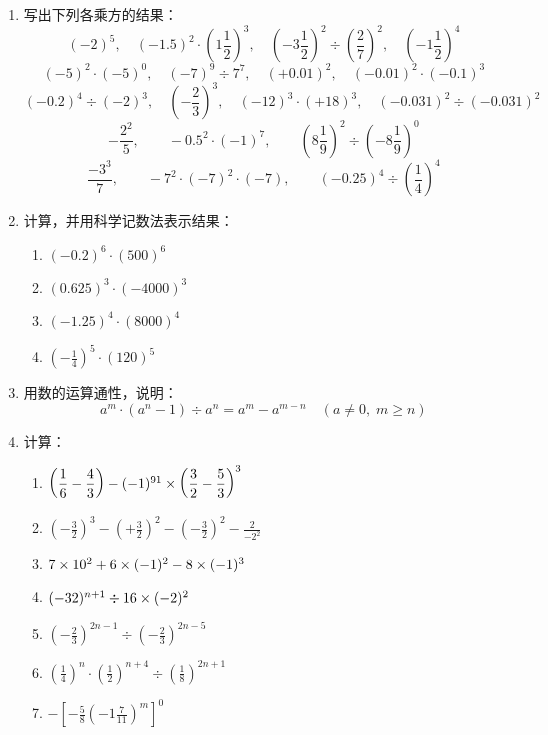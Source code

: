 \begin{enumerate}
\item 写出下列各乘方的结果：
\[(-2)^{5},\quad (-1.5)^{2} \cdot\left(1 \frac{1}{2}\right)^{3},\quad  \left(-3 \frac{1}{2}\right)^{2} \div\left(\frac{2}{7}\right)^{2} ,\quad \left(-1 \frac{1}{2}\right)^{4}\]
\[(-5)^{2} \cdot(-5)^{0} ,\quad(-7)^{9}\div 7^{7} ,\quad (+0.01)^2,\quad (-0.01)^2\cdot (-0.1)^3\]
\[(-0.2)^4\div (-2)^3,\quad \left(-\frac{2}{3}\right)^3,\quad (-12)^3\cdot (+18)^3,\quad (-0.031)^2\div (-0.031)^2\]
\[-\frac{2^2}{5},\qquad -0.5^2\cdot (-1)^7,\qquad \left(8\frac{1}{9}\right)^2\div \left(-8\frac{1}{9}\right)^0\]
\[\frac{-3^3}{7},\qquad -7^2\cdot (-7)^2\cdot (-7),\qquad (-0.25)^4\div \left(\frac{1}{4}\right)^4\]

\item  计算，并用科学记数法表示结果：
\begin{multicols}{2}
    \begin{enumerate}
        \item $(-0.2)^6\cdot (500)^6$
        \item $(0.625)^3\cdot (-4000)^3$
        \item $(-1.25)^4\cdot (8000)^4$
        \item $\left(-\frac{1}{4}\right)^5\cdot (120)^5$
    \end{enumerate}
\end{multicols}

\item 用数的运算通性，说明：
\[a^m\cdot (a^n-1)\div a^n=a^m-a^{m-n}\quad (a\ne 0,\; m\ge n)\]

\item 计算：
\begin{enumerate}
    \item $\left(\dfrac{1}{6}-\dfrac{4}{3}\right)-(-1)^{91}\times \left(\dfrac{3}{2}-\dfrac{5}{3}\right)^3$
    \item $\left(-\frac{3}{2}\right)^3-\left(+\frac{3}{2}\right)^2-\left(-\frac{3}{2}\right)^2-\frac{2}{-2^2}$
    \item $7\times 10^2+6\times (-1)^2-8\times (-1)^3$
    \item $(-32)^{n+1}\div 16\times (-2)^2$
    \item $\left(-\frac{2}{3}\right)^{2n-1}\div \left(-\frac{2}{3}\right)^{2n-5}$
    \item $\left(\frac{1}{4}\right)^{n}\cdot \left(\frac{1}{2}\right)^{n+4}\div \left(\frac{1}{8}\right)^{2n+1}$
    \item $-\left[-\frac{5}{8}\left(-1\frac{7}{11}\right)^m\right]^0$
\end{enumerate}


\end{enumerate}
